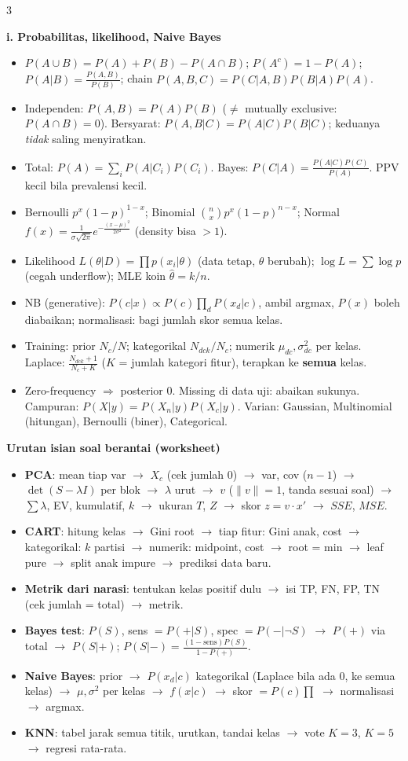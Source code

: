 \documentclass[8pt]{extarticle}
\newcommand{\sect}[1]{\par\vspace{1.5pt}\colorbox{black!12}{\parbox{\dimexpr\columnwidth-2\fboxsep}{\textbf{#1}}}\par\vspace{0.8pt}}
\begin{document}
\begin{multicols*}{3}
\sect{i. Probabilitas, likelihood, Naive Bayes}
\begin{itemize}
\item $P(A\cup B)=P(A)+P(B)-P(A\cap B)$; $P(A^c)=1-P(A)$; $P(A|B)=\frac{P(A,B)}{P(B)}$; chain $P(A,B,C)=P(C|A,B)P(B|A)P(A)$.
\item Independen: $P(A,B)=P(A)P(B)$ ($\ne$ mutually exclusive: $P(A\cap B)=0$). Bersyarat: $P(A,B|C)=P(A|C)P(B|C)$; keduanya \emph{tidak} saling menyiratkan.
\item Total: $P(A)=\sum_iP(A|C_i)P(C_i)$. Bayes: $P(C|A)=\frac{P(A|C)P(C)}{P(A)}$. PPV kecil bila prevalensi kecil.
\item Bernoulli $p^x(1-p)^{1-x}$; Binomial $\binom nx p^x(1-p)^{n-x}$; Normal $f(x)=\frac{1}{\sigma\sqrt{2\pi}}e^{-\frac{(x-\mu)^2}{2\sigma^2}}$ (density bisa $>1$).
\item Likelihood $L(\theta|D)=\prod p(x_i|\theta)$ (data tetap, $\theta$ berubah); $\log L=\sum\log p$ (cegah underflow); MLE koin $\hat\theta=k/n$.
\item NB (generative): $P(c|x)\propto P(c)\prod_dP(x_d|c)$, ambil argmax, $P(x)$ boleh diabaikan; normalisasi: bagi jumlah skor semua kelas.
\item Training: prior $N_c/N$; kategorikal $N_{dck}/N_c$; numerik $\mu_{dc},\sigma^2_{dc}$ per kelas. Laplace: $\frac{N_{dck}+1}{N_c+K}$ ($K$ = jumlah kategori fitur), terapkan ke \textbf{semua} kelas.
\item Zero-frequency $\Rightarrow$ posterior 0. Missing di data uji: abaikan sukunya. Campuran: $P(X|y)=P(X_n|y)P(X_c|y)$. Varian: Gaussian, Multinomial (hitungan), Bernoulli (biner), Categorical.
\end{itemize}

\sect{Urutan isian soal berantai (worksheet)}
\begin{itemize}
\item \textbf{PCA}: mean tiap var $\to$ $X_c$ (cek jumlah 0) $\to$ var, cov ($n-1$) $\to$ $\det(S-\lambda I)$ per blok $\to$ $\lambda$ urut $\to$ $v$ ($\|v\|=1$, tanda sesuai soal) $\to$ $\sum\lambda$, EV, kumulatif, $k$ $\to$ ukuran $T$, $Z$ $\to$ skor $z=v\cdot x'$ $\to$ $SSE$, $MSE$.
\item \textbf{CART}: hitung kelas $\to$ Gini root $\to$ tiap fitur: Gini anak, cost $\to$ kategorikal: $k$ partisi $\to$ numerik: midpoint, cost $\to$ root = min $\to$ leaf pure $\to$ split anak impure $\to$ prediksi data baru.
\item \textbf{Metrik dari narasi}: tentukan kelas positif dulu $\to$ isi TP, FN, FP, TN (cek jumlah = total) $\to$ metrik.
\item \textbf{Bayes test}: $P(S)$, sens $=P(+|S)$, spec $=P(-|\neg S)$ $\to$ $P(+)$ via total $\to$ $P(S|+)$; $P(S|-)=\frac{(1-\text{sens})P(S)}{1-P(+)}$.
\item \textbf{Naive Bayes}: prior $\to$ $P(x_d|c)$ kategorikal (Laplace bila ada 0, ke semua kelas) $\to$ $\mu,\sigma^2$ per kelas $\to$ $f(x|c)$ $\to$ skor $=P(c)\prod$ $\to$ normalisasi $\to$ argmax.
\item \textbf{KNN}: tabel jarak semua titik, urutkan, tandai kelas $\to$ vote $K=3$, $K=5$ $\to$ regresi rata-rata.
\end{itemize}
\end{multicols*}
\end{document}
